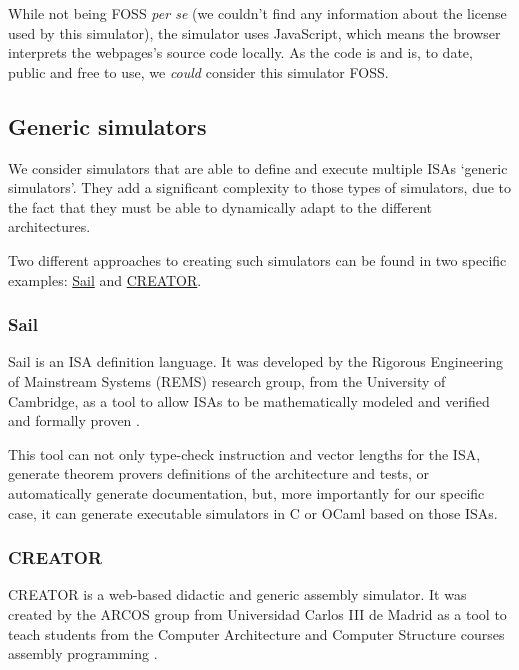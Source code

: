 While not being \gls{FOSS} \textit{per se} (we couldn't find any information about the license used by this simulator), the simulator uses JavaScript, which means the browser interprets the webpages's source code locally. As the code is  and is, to date, public and free to use, we \textit{could} consider this simulator \gls{FOSS}.



\subsection{Generic simulators}\label{subsec:generic-assembly-simulators}
We consider simulators that are able to define and execute multiple \glspl{ISA} `generic simulators'. They add a significant complexity to those types of simulators, due to the fact that they must be able to dynamically adapt to the different architectures.

Two different approaches to creating such simulators can be found in two specific examples: \hyperref[subsubsec:sail]{Sail} and \hyperref[subsubsec:creator]{CREATOR}.


\subsubsection*{Sail}\label{subsubsec:sail}
Sail \parencite{sail} is an \gls{ISA} definition language. It was developed by the Rigorous Engineering of Mainstream Systems (REMS) \parencite{rems} research group, from the University of Cambridge, as a tool to allow \glspl{ISA} to be mathematically modeled and verified and formally proven \parencite{ArmstrongAlasdair2019IsfA}.

This tool can not only type-check instruction and vector lengths for the \gls{ISA}, generate \glspl{theorem prover} definitions of the architecture and tests, or automatically generate documentation, but, more importantly for our specific case, it can generate executable simulators in C or OCaml based on those \glspl{ISA}.


\subsubsection*{CREATOR}\label{subsubsec:creator}
CREATOR \parencite{creator} is a web-based didactic and generic \gls{assembly} simulator. It was created by the ARCOS group from Universidad Carlos III de Madrid as a tool to teach students from the Computer Architecture and Computer Structure courses \gls{assembly} programming \parencite{creatorZenodo}.

